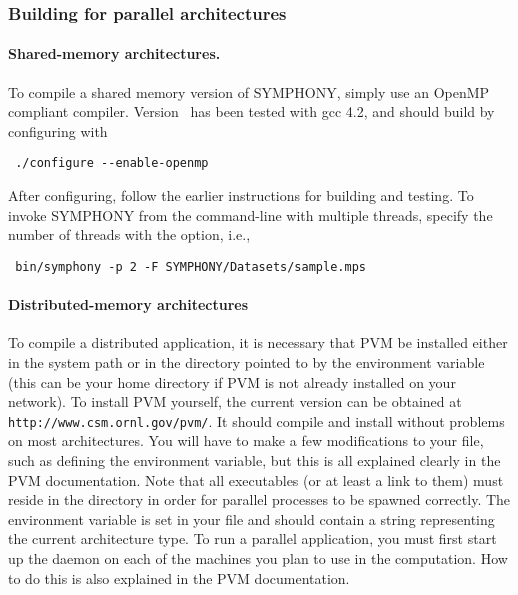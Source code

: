 \subsubsection{Building for parallel architectures}

\paragraph{Shared-memory architectures.}

To compile a shared memory version of SYMPHONY, simply use an OpenMP compliant
compiler. Version \VER\  has been tested with gcc 4.2, and should build by
configuring with
{\color{Brown}
\begin{verbatim}
 ./configure --enable-openmp
\end{verbatim}
} 
After configuring, follow the earlier instructions for building and testing.
To invoke SYMPHONY from the command-line with multiple threads, specify the
number of threads with the  option, i.e., {\color{Brown}
\begin{verbatim}
 bin/symphony -p 2 -F SYMPHONY/Datasets/sample.mps
\end{verbatim}
}

\paragraph{Distributed-memory architectures}
\label{distributed-build}

\label{PVM}
To compile a distributed application, it is necessary that PVM be installed
either in the system path or in the directory pointed to by the environment
variable  (this can be your home directory if PVM is not
already installed on your network). To install PVM yourself, the current
version can be obtained at \texttt{
{http://www.csm.ornl.gov/pvm/}}. It should compile and install without
problems on most architectures. You will have to make a few modifications to
your  file, such as defining the  environment
variable, but this is all explained clearly in the PVM documentation. Note
that all executables (or at least a link to them) must reside in the
 directory in order for parallel processes
to be spawned correctly. The environment variable  is set in
your  file and should contain a string representing the current
architecture type. To run a parallel application, you must first start up the
daemon on each of the machines you plan to use in the computation. How to do
this is also explained in the PVM documentation.

